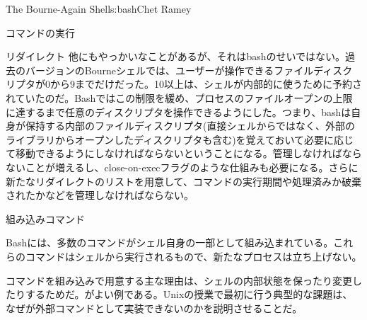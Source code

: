 \begin{aosachapter}{The Bourne-Again Shell}{s:bash}{Chet Ramey}
\begin{aosasect1}{コマンドの実行}
\begin{aosasect2}{リダイレクト}
他にもやっかいなことがあるが、それはbashのせいではない。過去のバージョンのBourneシェルでは、ユーザーが操作できるファイルディスクリプタが0から9までだけだった。10以上は、シェルが内部的に使うために予約されていたのだ。Bashではこの制限を緩め、プロセスのファイルオープンの上限に達するまで任意のディスクリプタを操作できるようにした。つまり、bashは自身が保持する内部のファイルディスクリプタ(直接シェルからではなく、外部のライブラリからオープンしたディスクリプタも含む)を覚えておいて必要に応じて移動できるようにしなければならないということになる。管理しなければならないことが増えるし、close-on-execフラグのような仕組みも必要になる。さらに新たなリダイレクトのリストを用意して、コマンドの実行期間や処理済みか破棄されたかなどを管理しなければならない。

\end{aosasect2}

\begin{aosasect2}{組み込みコマンド}

Bashには、多数のコマンドがシェル自身の一部として組み込まれている。これらのコマンドはシェルから実行されるもので、新たなプロセスは立ち上げない。

コマンドを組み込みで用意する主な理由は、シェルの内部状態を保ったり変更したりするためだ。がよい例である。Unixの授業で最初に行う典型的な課題は、なぜが外部コマンドとして実装できないのかを説明させることだ。


\end{aosasect2}
\end{aosasect1}
\end{aosachapter}
